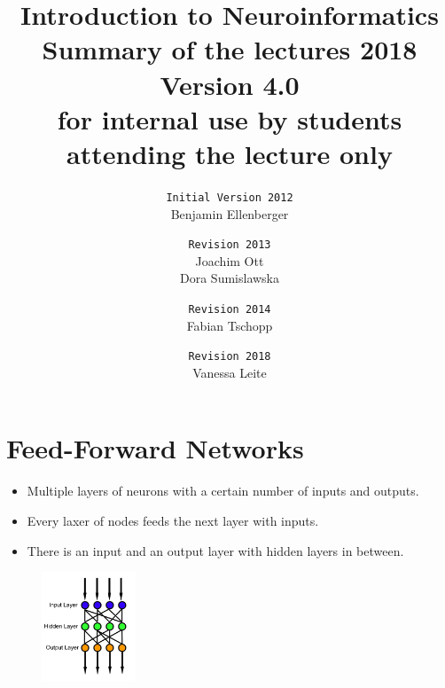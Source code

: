 \documentclass[a4paper, 12pt]{article}
\title{\textbf{Introduction to Neuroinformatics} \\Summary of the lectures
2018\\\normalsize Version 4.0 \\
for internal use by students attending the lecture only}
\author{
\texttt{Initial Version 2012}\\
	Benjamin Ellenberger
\and
\texttt{Revision 2013}\\
	Joachim Ott\\Dora Sumislawska
\and
\texttt{Revision 2014}\\
	Fabian Tschopp
\and
\texttt{Revision 2018}\\
	Vanessa Leite}
\date{}
\begin{document}
\maketitle
\newpage
\tableofcontents
\newpage

\newpage

























\newpage

\section{Feed-Forward Networks}
\begin{itemize}[noitemsep,nolistsep]
	\item Multiple layers of neurons with a certain number of inputs and outputs.
	\item Every laxer of nodes feeds the next layer with inputs.
	\item There is an input and an output layer with hidden layers in between.
\end{itemize}
\begin{figure}[H]
	\includegraphics[width=0.25\textwidth]{Feed_forward_neural_net.png}
\end{figure}
\end{document}

